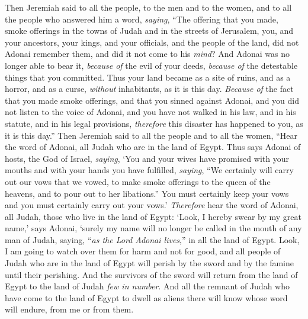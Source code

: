 \begin{biblechapter}
\verse Then Jeremiah said to all the people, to the men and to the women, and to all the people who answered him a word, \textit{saying},
\verse “The offering that you made, smoke offerings in the towns of Judah and in the streets of Jerusalem, you, and your ancestors, your kings, and your officials, and the people of the land, did not Adonai remember them, and did it not come to his \textit{mind}?
\verse And Adonai was no longer able to bear it, \textit{because of} the evil of your deeds, \textit{because of} the detestable things that you committed. Thus your land became as a site of ruins, and as a horror, and as a curse, \textit{without} inhabitants, as it is this day.
\verse \textit{Because of} the fact that you made smoke offerings, and that you sinned against Adonai, and you did not listen to the voice of Adonai, and you have not walked in his law, and in his statute, and in his legal provisions, \textit{therefore} this disaster has happened to you, as it is this day.”
\verse Then Jeremiah said to all the people and to all the women, “Hear the word of Adonai, all Judah who are in the land of Egypt.
\verse Thus says Adonai of hosts, the God of Israel, \textit{saying}, ‘You and your wives have promised with your mouths and with your hands you have fulfilled, \textit{saying}, “We certainly will carry out our vows that we vowed, to make smoke offerings to the queen of the heavens, and to pour out to her libations.” You must certainly keep your vows and you must certainly carry out your vows.’
\verse \textit{Therefore} hear the word of Adonai, all Judah, those who live in the land of Egypt: ‘Look, I hereby swear by my great name,’ says Adonai, ‘surely my name will no longer be called in the mouth of any man of Judah, saying, “\textit{as the Lord Adonai lives},” in all the land of Egypt.
\verse Look, I am going to watch over them for harm and not for good, and all people of Judah who are in the land of Egypt will perish by the sword and by the famine until their perishing.
\verse And the survivors of the sword will return from the land of Egypt to the land of Judah \textit{few in number}. And all the remnant of Judah who have come to the land of Egypt to dwell as aliens there will know whose word will endure, from me or from them.

\end{biblechapter}
